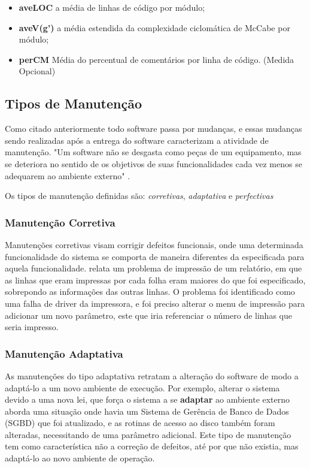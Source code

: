 \begin{itemize}
\item \textbf{aveLOC} a média de linhas de código por módulo;
\end{itemize}
\begin{itemize}
\item \textbf{aveV(g')} a média estendida da complexidade ciclomática de McCabe por módulo;
\end{itemize}

\begin{itemize}
\item \textbf{perCM} Média do percentual de comentários por linha de código. (Medida Opcional)
\end{itemize}

\subsection{Tipos de Manutenção}
Como citado anteriormente todo software passa por mudanças, e essas mudanças sendo realizadas após a entrega do software caracterizam a atividade de manutenção. "Um software não se desgasta como peças de um equipamento, mas se deteriora no sentido de os objetivos de suas funcionalidades cada vez menos se adequarem ao ambiente externo" \space  \cite[p.~33]{matheus2007}.

Os tipos de manutenção definidas são:  \textit{corretivas}, \textit{adaptativa} e \textit{perfectivas} 
\subsubsection{Manutenção Corretiva}
Manutenções corretivas visam corrigir defeitos funcionais, onde uma determinada funcionalidade do sistema se comporta de maneira diferentes da especificada para aquela funcionalidade.
 relata um problema de impressão de um relatório, em que as linhas que eram impressas por cada folha eram maiores do que foi especificado, sobrepondo as informações das outras linhas. O problema foi identificado como uma falha de driver da impressora, e foi preciso alterar o menu de impressão para adicionar um novo parâmetro, este que iria referenciar o número de linhas que seria impresso.
\subsubsection{Manutenção Adaptativa}
As manutenções do tipo adaptativa retratam a alteração do software de modo a adaptá-lo a um novo ambiente de execução. Por exemplo, alterar o sistema devido a uma nova lei, que força o sistema a se \textbf{adaptar} ao ambiente externo  aborda uma situação onde havia um Sistema de  Gerência de Banco de Dados (SGBD) que foi atualizado, e as rotinas de acesso ao disco também foram alteradas, necessitando de uma parâmetro adicional. Este tipo de manutenção tem como característica não a correção de defeitos, até por que não existia, mas adaptá-lo ao novo ambiente de operação.
